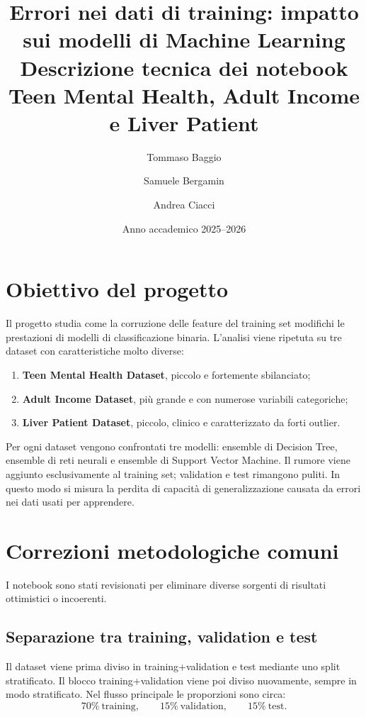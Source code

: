 \documentclass[11pt,a4paper]{article}
\title{\textbf{Errori nei dati di training: impatto sui modelli di Machine Learning}\\
\large Descrizione tecnica dei notebook Teen Mental Health, Adult Income e Liver Patient}
\author{Tommaso Baggio \and Samuele Bergamin \and Andrea Ciacci}
\date{Anno accademico 2025--2026}
\begin{document}
\maketitle
\tableofcontents
\newpage

\section{Obiettivo del progetto}

Il progetto studia come la corruzione delle feature del training set modifichi le prestazioni di modelli di classificazione binaria. L'analisi viene ripetuta su tre dataset con caratteristiche molto diverse:
\begin{enumerate}
    \item \textbf{Teen Mental Health Dataset}, piccolo e fortemente sbilanciato;
    \item \textbf{Adult Income Dataset}, più grande e con numerose variabili categoriche;
    \item \textbf{Liver Patient Dataset}, piccolo, clinico e caratterizzato da forti outlier.
\end{enumerate}

Per ogni dataset vengono confrontati tre modelli: ensemble di Decision Tree, ensemble di reti neurali e ensemble di Support Vector Machine. Il rumore viene aggiunto esclusivamente al training set; validation e test rimangono puliti. In questo modo si misura la perdita di capacità di generalizzazione causata da errori nei dati usati per apprendere.

\section{Correzioni metodologiche comuni}

I notebook sono stati revisionati per eliminare diverse sorgenti di risultati ottimistici o incoerenti.

\subsection{Separazione tra training, validation e test}

Il dataset viene prima diviso in training+validation e test mediante uno split stratificato. Il blocco training+validation viene poi diviso nuovamente, sempre in modo stratificato. Nel flusso principale le proporzioni sono circa:
\[
70\%\ \text{training}, \qquad 15\%\ \text{validation}, \qquad 15\%\ \text{test}.
\]
\end{document}
